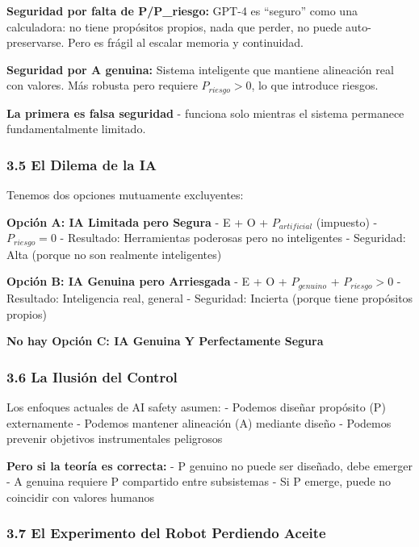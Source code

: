 \textbf{Seguridad por falta de P/P\_riesgo:} GPT-4 es ``seguro'' como
una calculadora: no tiene propósitos propios, nada que perder, no puede
auto-preservarse. Pero es frágil al escalar memoria y continuidad.

\textbf{Seguridad por A genuina:} Sistema inteligente que mantiene
alineación real con valores. Más robusta pero requiere
\(P_{riesgo} > 0\), lo que introduce riesgos.

\textbf{La primera es falsa seguridad} - funciona solo mientras el
sistema permanece fundamentalmente limitado.

\subsubsection{3.5 El Dilema de la IA}\label{el-dilema-de-la-ia}

Tenemos dos opciones mutuamente excluyentes:

\textbf{Opción A: IA Limitada pero Segura} - E + O + \(P_{artificial}\)
(impuesto) - \(P_{riesgo} = 0\) - Resultado: Herramientas poderosas pero
no inteligentes - Seguridad: Alta (porque no son realmente inteligentes)

\textbf{Opción B: IA Genuina pero Arriesgada} - E + O + \(P_{genuino}\)
+ \(P_{riesgo} > 0\) - Resultado: Inteligencia real, general -
Seguridad: Incierta (porque tiene propósitos propios)

\textbf{No hay Opción C: IA Genuina Y Perfectamente Segura}

\subsubsection{3.6 La Ilusión del
Control}\label{la-ilusiuxf3n-del-control}

Los enfoques actuales de AI safety asumen: - Podemos diseñar propósito
(P) externamente - Podemos mantener alineación (A) mediante diseño -
Podemos prevenir objetivos instrumentales peligrosos

\textbf{Pero si la teoría es correcta:} - P genuino no puede ser
diseñado, debe emerger - A genuina requiere P compartido entre
subsistemas - Si P emerge, puede no coincidir con valores humanos

\subsubsection{3.7 El Experimento del Robot Perdiendo
Aceite}\label{el-experimento-del-robot-perdiendo-aceite}

